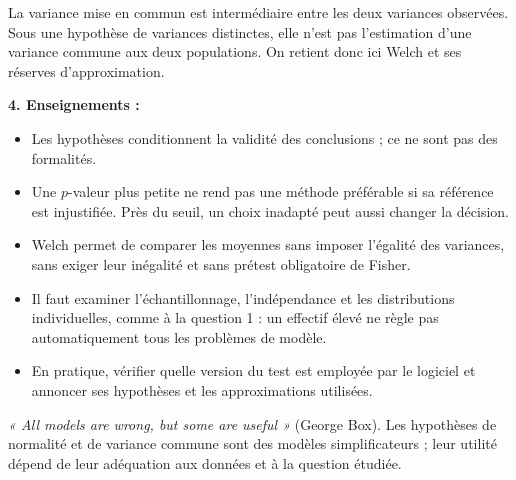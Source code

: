 {\begin{enumerate}
{La variance mise en commun est intermédiaire entre les deux variances observées. Sous une hypothèse de variances distinctes, elle n'est pas l'estimation d'une variance commune aux deux populations. On retient donc ici Welch et ses réserves d'approximation.

\textbf{4. Enseignements :}
\begin{itemize}
\item Les hypothèses conditionnent la validité des conclusions ; ce ne sont pas des formalités.
\item Une $p$-valeur plus petite ne rend pas une méthode préférable si sa référence est injustifiée. Près du seuil, un choix inadapté peut aussi changer la décision.
\item Welch permet de comparer les moyennes sans imposer l'égalité des variances, sans exiger leur inégalité et sans prétest obligatoire de Fisher.
\item Il faut examiner l'échantillonnage, l'indépendance et les distributions individuelles, comme à la question 1 : un effectif élevé ne règle pas automatiquement tous les problèmes de modèle.
\item En pratique, vérifier quelle version du test est employée par le logiciel et annoncer ses hypothèses et les approximations utilisées.
\end{itemize}
\textit{« All models are wrong, but some are useful »} (George Box). Les hypothèses de normalité et de variance commune sont des modèles simplificateurs ; leur utilité dépend de leur adéquation aux données et à la question étudiée.
}
\end{enumerate}
}
